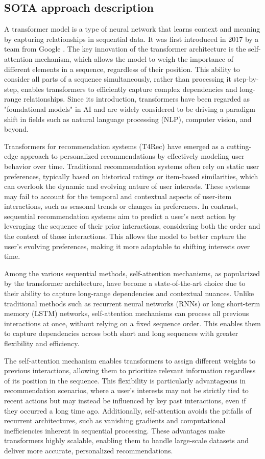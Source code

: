 \documentclass{article}
\begin{document}
\subsection{SOTA approach description}
A transformer model is a type of neural network that learns context and meaning by capturing relationships in sequential data. It was first introduced in 2017 by a team from Google \cite{transformer}. The key innovation of the transformer architecture is the self-attention mechanism, which allows the model to weigh the importance of different elements in a sequence, regardless of their position. This ability to consider all parts of a sequence simultaneously, rather than processing it step-by-step, enables transformers to efficiently capture complex dependencies and long-range relationships. Since its introduction, transformers have been regarded as "foundational models" in AI and are widely considered to be driving a paradigm shift in fields such as natural language processing (NLP), computer vision, and beyond.

Transformers for recommendation systems (T4Rec) have emerged as a cutting-edge approach to personalized recommendations by effectively modeling user behavior over time. Traditional recommendation systems often rely on static user preferences, typically based on historical ratings or item-based similarities, which can overlook the dynamic and evolving nature of user interests. These systems may fail to account for the temporal and contextual aspects of user-item interactions, such as seasonal trends or changes in preferences. In contrast, sequential recommendation systems aim to predict a user’s next action by leveraging the sequence of their prior interactions, considering both the order and the context of those interactions. This allows the model to better capture the user's evolving preferences, making it more adaptable to shifting interests over time.

Among the various sequential methods, self-attention mechanisms, as popularized by the transformer architecture, have become a state-of-the-art choice due to their ability to capture long-range dependencies and contextual nuances. Unlike traditional methods such as recurrent neural networks (RNNs) or long short-term memory (LSTM) networks, self-attention mechanisms can process all previous interactions at once, without relying on a fixed sequence order. This enables them to capture dependencies across both short and long sequences with greater flexibility and efficiency.

The self-attention mechanism enables transformers to assign different weights to previous interactions, allowing them to prioritize relevant information regardless of its position in the sequence. This flexibility is particularly advantageous in recommendation scenarios, where a user’s interests may not be strictly tied to recent actions but may instead be influenced by key past interactions, even if they occurred a long time ago. Additionally, self-attention avoids the pitfalls of recurrent architectures, such as vanishing gradients and computational inefficiencies inherent in sequential processing. These advantages make transformers highly scalable, enabling them to handle large-scale datasets and deliver more accurate, personalized recommendations.
\end{document}
